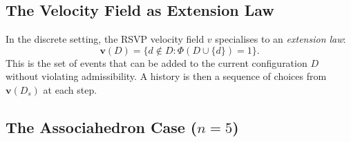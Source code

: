 \documentclass[12pt, oneside]{amsart}
\theoremstyle{plain}
\theoremstyle{definition}
\theoremstyle{remark}
\newcommand{\Phif}{\Phi}   %
\newcommand{\vf}{v}         %
\begin{document}
\subsection{The Velocity Field as Extension Law}

In the discrete setting, the RSVP velocity field $\vf$ specialises to an \emph{extension law}:
\[
  \mathbf{v}(D) = \{d \notin D : \Phif(D \cup \{d\}) = 1\}.
\]
This is the set of events that can be added to the current configuration $D$ without violating admissibility. A history is then a sequence of choices from $\mathbf{v}(D_s)$ at each step.

\subsection{The Associahedron Case ($n = 5$)}
\end{document}
